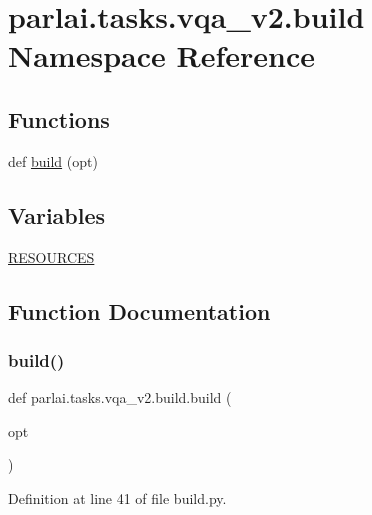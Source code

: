\hypertarget{namespaceparlai_1_1tasks_1_1vqa__v2_1_1build}{}\section{parlai.\+tasks.\+vqa\+\_\+v2.\+build Namespace Reference}
\label{namespaceparlai_1_1tasks_1_1vqa__v2_1_1build}
\subsection*{Functions}
\begin{DoxyCompactItemize}
\item 
def \hyperlink{namespaceparlai_1_1tasks_1_1vqa__v2_1_1build_ad8bd5179304b2b092593e6876da288f9}{build} (opt)
\end{DoxyCompactItemize}
\subsection*{Variables}
\begin{DoxyCompactItemize}
\item 
\hyperlink{namespaceparlai_1_1tasks_1_1vqa__v2_1_1build_a8dccbe691a8c92e52857fad46442cff7}{R\+E\+S\+O\+U\+R\+C\+ES}
\end{DoxyCompactItemize}


\subsection{Function Documentation}
\mbox{\label{namespaceparlai_1_1tasks_1_1vqa__v2_1_1build_ad8bd5179304b2b092593e6876da288f9}} 
\subsubsection{\texorpdfstring{build()}{build()}}
{\footnotesize\ttfamily def parlai.\+tasks.\+vqa\+\_\+v2.\+build.\+build (\begin{DoxyParamCaption}\item[{}]{opt }\end{DoxyParamCaption})}



Definition at line 41 of file build.\+py.


